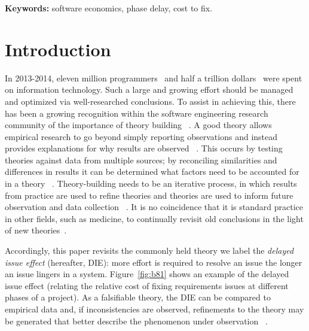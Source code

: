 \documentclass[smallcondensed]{svjour3}
\newcommand{\fig}[1]{Figure~\ref{fig:#1}}
\begin{document}
\vspace{1mm}
\noindent
{\bf Keywords:} software economics, phase delay, cost to fix.
  
\section{Introduction}
In 2013-2014, 
eleven  million programmers~\cite{avram14} and
half a trillion dollars~\cite{pettey14} were spent on information technology.
Such a large and growing effort should be managed and optimized via  well-researched conclusions.  
To assist in achieving this, there has been a growing recognition within the software engineering research community 
of the importance of theory building ~\cite{Sjoberg08, Paivarinta15, Stol15}. A good theory allows empirical research to go beyond simply
reporting observations and instead provides explanations for why results are observed ~\cite{Stol15}. This occurs by testing theories against data from multiple sources; by reconciling similarities and differences in results it can be determined what factors need to be accounted for in a theory ~\cite{Shull08}. Theory-building needs to be an iterative process,
in which results from practice are used to refine theories and theories are used to inform future observation and data collection ~\cite{Paivarinta15, Stol15}. It is no coincidence that it is standard practice
in other fields, such as medicine,
to continually revisit old conclusions in the light of new theories~\cite{prasad13}.


Accordingly, this paper revisits
the commonly held theory we label the {\em delayed issue effect} (hereafter, DIE):
more effort is required to resolve an issue the longer an issue lingers in a system.
 \fig{b81} shows an example of the delayed issue effect (relating
 the relative cost of fixing requirements issues at different phases of a project). As a falsifiable theory, the DIE can be compared to empirical data and, if inconsistencies are observed, refinements to the theory may be generated that better describe the phenomenon under observation ~\cite{Popper}.
 
\end{document}
